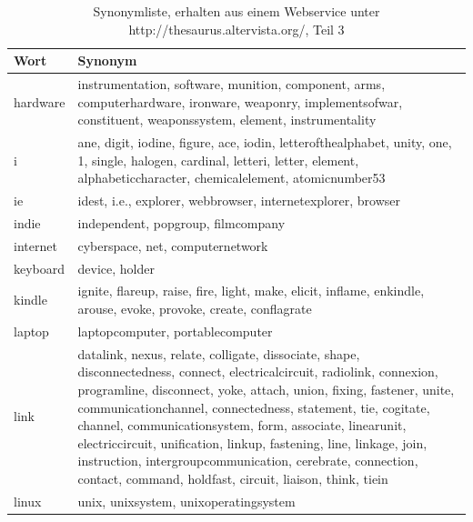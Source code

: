 \documentclass[12pt,a4paper]{report}
\begin{document}
	\begin{table}[H]
\caption{Synonymliste, erhalten aus einem Webservice unter http://thesaurus.altervista.org/, Teil 3 }
\begin{center}
\begin{tabular}{ |l|p{14cm}|}
\hline
\textbf{Wort} & \textbf{Synonym}\\
\hline
hardware & instrumentation, software, munition, component, arms, computerhardware, ironware, weaponry, implementsofwar, constituent, weaponssystem, element, instrumentality\\
\hline
i & ane, digit, iodine, figure, ace, iodin, letterofthealphabet, unity, one, 1, single, halogen, cardinal, letteri, letter, element, alphabeticcharacter, chemicalelement, atomicnumber53\\
\hline
ie & idest, i.e., explorer, webbrowser, internetexplorer, browser\\
\hline
indie & independent, popgroup, filmcompany\\
\hline
internet & cyberspace, net, computernetwork\\
\hline
keyboard & device, holder\\
\hline
kindle & ignite, flareup, raise, fire, light, make, elicit, inflame, enkindle, arouse, evoke, provoke, create, conflagrate\\
\hline
laptop & laptopcomputer, portablecomputer\\
\hline
link & datalink, nexus, relate, colligate, dissociate, shape, disconnectedness, connect, electricalcircuit, radiolink, connexion, programline, disconnect, yoke, attach, union, fixing, fastener, unite, communicationchannel, connectedness, statement, tie, cogitate, channel, communicationsystem, form, associate, linearunit, electriccircuit, unification, linkup, fastening, line, linkage, join, instruction, intergroupcommunication, cerebrate, connection, contact, command, holdfast, circuit, liaison, think, tiein\\
\hline

linux & unix, unixsystem, unixoperatingsystem\\
\hline


\end{tabular}
\end{center}
\end{table}
\end{document}
